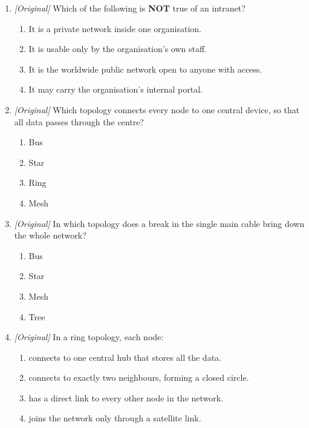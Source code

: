 \begin{enumerate}[label=\textbf{Q\arabic*.}, leftmargin=*]
\begin{enumerate}[label=\Alph*.]
    \item LAN
    \item MAN
    \item WLAN built only with infrared remotes
  \end{enumerate}
\item \textit{[Original]} Which of the following is \textbf{NOT} true of an
  intranet?
  \begin{enumerate}[label=\Alph*.]
    \item It is a private network inside one organisation.
    \item It is usable only by the organisation's own staff.
    \item It is the worldwide public network open to anyone with access.
    \item It may carry the organisation's internal portal.
  \end{enumerate}
\item \textit{[Original]} Which topology connects every node to one central
  device, so that all data passes through the centre?
  \begin{enumerate}[label=\Alph*.]
    \item Bus
    \item Star
    \item Ring
    \item Mesh
  \end{enumerate}
\item \textit{[Original]} In which topology does a break in the single main
  cable bring down the whole network?
  \begin{enumerate}[label=\Alph*.]
    \item Bus
    \item Star
    \item Mesh
    \item Tree
  \end{enumerate}
\item \textit{[Original]} In a ring topology, each node:
  \begin{enumerate}[label=\Alph*.]
    \item connects to one central hub that stores all the data.
    \item connects to exactly two neighbours, forming a closed circle.
    \item has a direct link to every other node in the network.
    \item joins the network only through a satellite link.
  \end{enumerate}

\end{enumerate}
